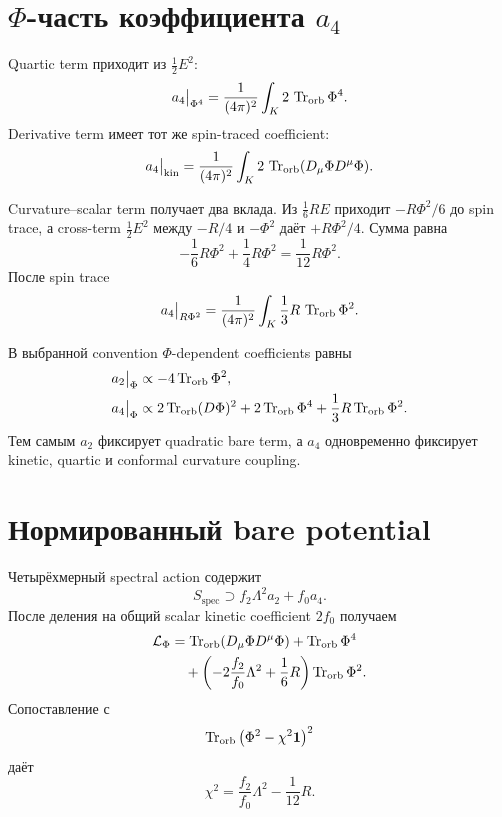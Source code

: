 \section{\(\Phi\)-часть коэффициента \(a_4\)}

Quartic term приходит из \(\frac12E^2\):
\begin{equation}
 a_4\big|_{\Phi^4}
 =
 \frac1{(4\pi)^2}
 \int_K
 2\,\operatorname{Tr}_{\mathrm{orb}}\Phi^4.
\end{equation}
Derivative term имеет тот же spin-traced coefficient:
\begin{equation}
 a_4\big|_{\mathrm{kin}}
 =
 \frac1{(4\pi)^2}
 \int_K
 2\,\operatorname{Tr}_{\mathrm{orb}}(D_\mu\Phi D^\mu\Phi).
\end{equation}

Curvature--scalar term получает два вклада. Из
\(\frac16RE\) приходит
\(-R\Phi^2/6\) до spin trace, а cross-term
\(\frac12E^2\) между \(-R/4\) и \(-\Phi^2\) даёт
\(+R\Phi^2/4\). Сумма равна
\begin{equation}
 -\frac16R\Phi^2+\frac14R\Phi^2
 =\frac1{12}R\Phi^2.
\end{equation}
После spin trace
\begin{equation}
 a_4\big|_{R\Phi^2}
 =
 \frac1{(4\pi)^2}
 \int_K
 \frac13R\,\operatorname{Tr}_{\mathrm{orb}}\Phi^2.
\end{equation}

\begin{theorem}
В выбранной convention \(\Phi\)-dependent coefficients равны
\begin{align}
 a_2\big|_\Phi
 &\propto-4\operatorname{Tr}_{\mathrm{orb}}\Phi^2,
 \\
 a_4\big|_\Phi
 &\propto
 2\operatorname{Tr}_{\mathrm{orb}}(D\Phi)^2
 +2\operatorname{Tr}_{\mathrm{orb}}\Phi^4
 +\frac13R\operatorname{Tr}_{\mathrm{orb}}\Phi^2.
\end{align}
Тем самым \(a_2\) фиксирует quadratic bare term, а \(a_4\) одновременно
фиксирует kinetic, quartic и conformal curvature coupling.
\end{theorem}

\section{Нормированный bare potential}

Четырёхмерный spectral action содержит
\begin{equation}
 S_{\mathrm{spec}}
 \supset
 f_2\Lambda^2a_2+f_0a_4.
\end{equation}
После деления на общий scalar kinetic coefficient \(2f_0\) получаем
\begin{align}
 \mathcal L_{\Phi}
 &=
 \operatorname{Tr}_{\mathrm{orb}}(D_\mu\Phi D^\mu\Phi)
 +\operatorname{Tr}_{\mathrm{orb}}\Phi^4
 \\
 &\quad
 +\left(
 -2\frac{f_2}{f_0}\Lambda^2
 +\frac16R
 \right)
 \operatorname{Tr}_{\mathrm{orb}}\Phi^2.
\end{align}
Сопоставление с
\begin{equation}
 \operatorname{Tr}_{\mathrm{orb}}
 \left(\Phi^2-\chi^2\mathbf1\right)^2
\end{equation}
даёт
\begin{equation}
 \boxed{
 \chi^2
 =
 \frac{f_2}{f_0}\Lambda^2
 -\frac1{12}R.}
\end{equation}

